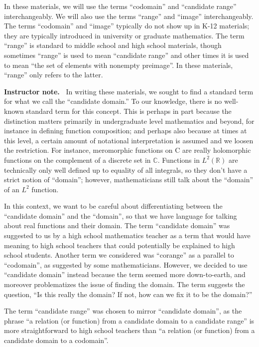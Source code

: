 \documentclass[11pt]{article}
\newenvironment{bignote}[1][Instructor note]%
	{\begin{mdframed}\raggedright{\bf #1.~}}
	{\end{mdframed}}
\theoremstyle{definition}
\begin{document}
\begin{note}
In these materials, we will use the terms ``codomain'' and ``candidate range'' interchangeably. We will also use the terms ``range'' and ``image'' interchangeably. The terms ``codomain'' and ``image'' typically do not show up in K-12 materials; they are typically introduced in university or graduate mathematics. The term ``range'' is standard to middle school and high school materials, though sometimes ``range'' is used to mean ``candidate range'' and other times it is used to mean ``the set of elements with nonempty preimage''. In these materials, ``range'' only refers to the latter.
\end{note}

\begin{bignote}
In writing these materials, we sought to find a standard term for what we call the ``candidate domain.'' To our knowledge, there is no well-known standard term for this concept. This is perhaps in part because the distinction matters primarily in undergraduate level mathematics and beyond, for instance in defining function composition; and perhaps also because at times at this level, a certain amount of notational interpretation is assumed and we loosen the restriction. For instance, meromorphic functions on C are really holomorphic functions on the complement of a discrete set in $\mathbb{C}$. Functions in
$L^2(\mathbb{R})$ are technically only well defined up to equality of all integrals, so
they don't have a strict notion of  ``domain''; however, mathematicians still talk about the ``domain'' of an  $L^2$ function.

In this context, we want to be careful about differentiating between the ``candidate domain'' and the ``domain'', so that we have language for talking about real functions and their domain. The term ``candidate domain'' was suggested to us by a high school mathematics teacher as a term that would have meaning to high school teachers that could potentially be explained to high school students. Another term we considered was ``corange'' as a parallel to ``codomain'', as suggested by some mathematicians. However, we decided to use ``candidate domain'' instead because the term seemed more down-to-earth, and moreover problematizes the issue of finding the domain. The term suggests the question, ``Is this really the domain? If not, how can we fix it to be the domain?''

The term ``candidate range'' was chosen to mirror ``candidate domain'', as the phrase ``a relation (or function) from a candidate domain to a candidate range'' is more straightforward to high school teachers than ``a relation (or function) from a candidate domain to a codomain''.  \end{bignote}
\end{document}
